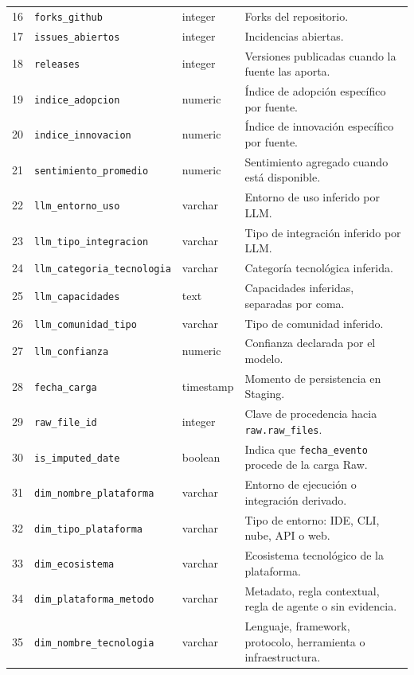 \documentclass[12pt,a4paper]{article}
\newcommand{\pathcode}[1]{\begingroup\small\ttfamily\nolinkurl{#1}\endgroup}
\begin{document}
\begin{longtable}{P{0.9cm} P{4.1cm} P{2.8cm} P{6.0cm}}
16 & \pathcode{forks_github} & integer & Forks del repositorio. \\
17 & \pathcode{issues_abiertos} & integer & Incidencias abiertas. \\
18 & \pathcode{releases} & integer & Versiones publicadas cuando la fuente las aporta. \\
19 & \pathcode{indice_adopcion} & numeric & Índice de adopción específico por fuente. \\
20 & \pathcode{indice_innovacion} & numeric & Índice de innovación específico por fuente. \\
21 & \pathcode{sentimiento_promedio} & numeric & Sentimiento agregado cuando está disponible. \\
22 & \pathcode{llm_entorno_uso} & varchar & Entorno de uso inferido por LLM. \\
23 & \pathcode{llm_tipo_integracion} & varchar & Tipo de integración inferido por LLM. \\
24 & \pathcode{llm_categoria_tecnologia} & varchar & Categoría tecnológica inferida. \\
25 & \pathcode{llm_capacidades} & text & Capacidades inferidas, separadas por coma. \\
26 & \pathcode{llm_comunidad_tipo} & varchar & Tipo de comunidad inferido. \\
27 & \pathcode{llm_confianza} & numeric & Confianza declarada por el modelo. \\
28 & \pathcode{fecha_carga} & timestamp & Momento de persistencia en Staging. \\
29 & \pathcode{raw_file_id} & integer & Clave de procedencia hacia \pathcode{raw.raw_files}. \\
30 & \pathcode{is_imputed_date} & boolean & Indica que \pathcode{fecha_evento} procede de la carga Raw. \\
31 & \pathcode{dim_nombre_plataforma} & varchar & Entorno de ejecución o integración derivado. \\
32 & \pathcode{dim_tipo_plataforma} & varchar & Tipo de entorno: IDE, CLI, nube, API o web. \\
33 & \pathcode{dim_ecosistema} & varchar & Ecosistema tecnológico de la plataforma. \\
34 & \pathcode{dim_plataforma_metodo} & varchar & Metadato, regla contextual, regla de agente o sin evidencia. \\
35 & \pathcode{dim_nombre_tecnologia} & varchar & Lenguaje, framework, protocolo, herramienta o infraestructura. \\

\end{longtable}
\end{document}
